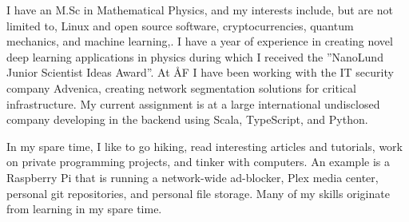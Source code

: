 
\begin{cvparagraph}

I have an M.Sc in Mathematical Physics, and my interests include, but are not
limited to, Linux and open source software, cryptocurrencies, quantum
mechanics, and machine learning,. I have a year of experience in creating
novel deep learning applications in physics during which I received the
”NanoLund Junior Scientist Ideas Award”. At ÅF I have been working with the IT
security company Advenica, creating network segmentation solutions for
critical infrastructure. My current assignment is at a large international
undisclosed company developing in the backend using Scala, TypeScript, and
Python.

In my spare time, I like to go hiking, read interesting articles and
tutorials, work on private programming projects, and tinker with computers. An
example is a Raspberry Pi that is running a network-wide ad-blocker, Plex
media center, personal git repositories, and personal file storage. Many of my
skills originate from learning in my spare time.

\end{cvparagraph}
